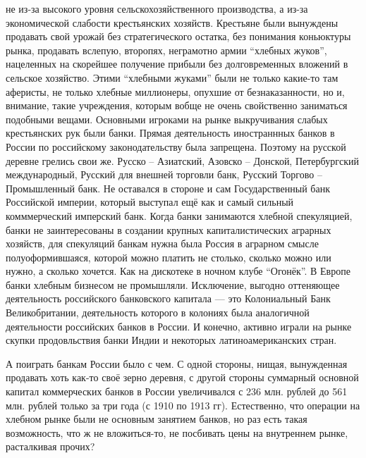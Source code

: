 \begin{enumerate}
не из-за высокого уровня сельскохозяйственного производства, а из-за
экономической слабости крестьянских хозяйств. Крестьяне были вынуждены продавать
свой урожай без стратегического остатка, без понимания коньюктуры рынка,
продавать вслепую, второпях, неграмотно армии \enquote{хлебных жуков},
нацеленных на скорейшее получение прибыли без долговременных вложений в сельское
хозяйство. Этими \enquote{хлебными жуками} были не только какие-то там аферисты,
не только хлебные миллионеры, опухшие от безнаказанности, но и, внимание, такие
учреждения, которым вобще не очень свойственно заниматься подобными вещами.
Основными игроками на рынке выкручивания слабых крестьянских рук были банки.
Прямая деятельность иностраннных банков в России по российскому законодательству
была запрещена. Поэтому на русской деревне грелись свои же. Русско -- Азиатский,
Азовско -- Донской, Петербургский международный, Русский для внешней торговли
банк, Русский Торгово -- Промышленный банк. Не оставался в стороне и сам
Государственный банк Российской империи, который выступал ещё как и самый
сильный комммерческий имперский банк. Когда банки занимаются хлебной
спекуляцией, банки не заинтересованы в создании крупных капиталистических
аграрных хозяйств, для спекуляций банкам нужна была Россия в аграрном смысле
полуоформившаяся, которой можно платить не столько, сколько можно или нужно, а
сколько хочется. Как на дискотеке в ночном клубе \enquote{Огонёк}. В Европе
банки хлебным бизнесом не промышляли. Исключение, выгодно оттеняющее
деятельность российского банковского капитала --- это Колониальный Банк
Великобритании, деятельность которого в колониях была аналогичной деятельности
российских банков в России. И конечно, активно играли на рынке скупки
продовльствия банки Индии и некоторых латиноамериканских стран.

А поиграть банкам России было с чем. С одной стороны, нищая, вынужденная
продавать хоть как-то своё зерно деревня, с другой стороны суммарный основной
капитал коммерческих банков в России увеличивался с 236 млн. рублей до 561 млн.
рублей только за три года (с 1910 по 1913 гг). Естественно, что операции на
хлебном рынке были не основным занятием банков, но раз есть такая возможность,
что ж не вложиться-то, не посбивать цены на внутреннем рынке, расталкивая
прочих?


\end{enumerate}
